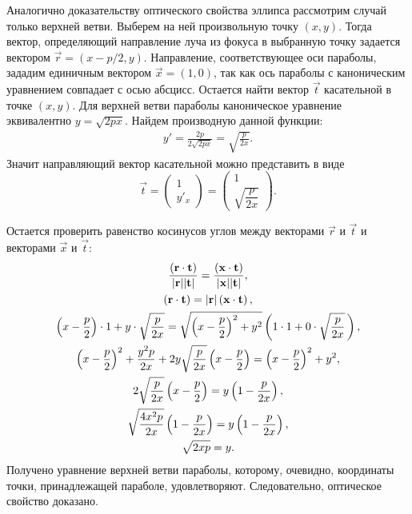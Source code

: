 Аналогично доказательству оптического свойства эллипса рассмотрим случай только верхней ветви. Выберем на ней произвольную точку $(x, y)$. Тогда вектор, определяющий направление луча из фокуса в выбранную точку задается вектором $\vec r = (x - p/2, y)$. Направление, соответствующее оси параболы, зададим единичным вектором $\vec x = (1, 0)$, так как ось параболы с каноническим уравнением совпадает с осью абсцисс. Остается найти вектор $\vec t$ касательной в точке $(x, y)$. Для верхней ветви параболы каноническое уравнение эквивалентно $y = \sqrt{2px}$. Найдем производную данной функции:
\begin{gather*}
    y' = \frac{2p}{2\sqrt{2px}} = \sqrt{\frac{p}{2x}}.
\end{gather*}
Значит направляющий вектор касательной можно представить в виде
\begin{equation*}
    \vec t =
    \begin{pmatrix}
        1\\
        y'_x
    \end{pmatrix} =
    \begin{pmatrix}
        1\\
        \sqrt{\dfrac{p}{2x}}
    \end{pmatrix}.
\end{equation*}

Остается проверить равенство косинусов углов между векторами $\vec r$ и $\vec t$ и векторами $\vec x$ и $\vec t$:
\begin{gather*}
    \frac{\left(\mathbf{r} \cdot \mathbf{t}\right)}{|\mathbf{r}| | \mathbf{t}|} = \frac{\left(\mathbf{x} \cdot \mathbf{t}\right)}{|\mathbf{x}| |\mathbf{t}|},\\
    \left(\mathbf{r} \cdot \mathbf{t}\right) = |\mathbf{r}| \left(\mathbf{x} \cdot \mathbf{t}\right),\\
    \left(x - \frac{p}{2}\right)\cdot 1 + y \cdot \sqrt{\frac{p}{2x}}  = \sqrt{\left( x - \frac{p}{2} \right)^2 + y^2 } \left(1 \cdot 1 + 0 \cdot \sqrt{\frac{p}{2x}} \,\right),\\
    \left(x - \frac{p}{2}\right)^2 + \frac{y^2 p}{2x} + 2 y \sqrt{\frac{p}{2x}} \left(x - \frac{p}{2}\right) = \left(x - \frac{p}{2}\right)^2 + y^2,\\
    2  \sqrt{\frac{p}{2x}} \left(x - \frac{p}{2}\right) =  y \left( 1 - \frac{p}{2x} \right),\\
    \sqrt{\frac{4x^2p}{2x}} \left(1 - \frac{p}{2x}\right) =  y \left( 1 - \frac{p}{2x} \right),\\
    \sqrt{2xp}  =  y.
\end{gather*}
Получено уравнение верхней ветви параболы, которому, очевидно, координаты точки, принадлежащей параболе, удовлетворяют. Следовательно, оптическое свойство доказано.

